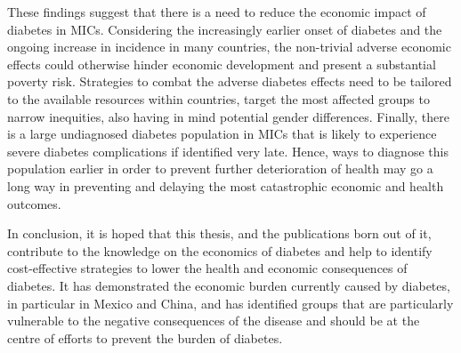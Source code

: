 These findings suggest that there is a need to reduce the economic impact of diabetes in \acp{MIC}. Considering the increasingly earlier onset of diabetes and the ongoing increase in incidence in many countries, the non-trivial adverse economic effects could otherwise hinder economic development and present a substantial poverty risk. Strategies to combat the adverse diabetes effects need to be tailored to the available resources within countries, target the most affected groups to narrow inequities, also having in mind potential gender differences. Finally, there is a large undiagnosed diabetes population in \acp{MIC} that is likely to experience severe diabetes complications if identified very late. Hence, ways to diagnose this population earlier in order to prevent further deterioration of health may go a long way in preventing and delaying the most catastrophic economic and health outcomes.

In conclusion, it is hoped that this thesis, and the publications born out of it, contribute to the knowledge on the economics of diabetes and help to identify cost-effective strategies to lower the health and economic consequences of diabetes. It has demonstrated the economic burden currently caused by diabetes, in particular in Mexico and China, and has identified groups that are particularly vulnerable to the negative consequences of the disease and should be at the centre of efforts to prevent the burden of diabetes.